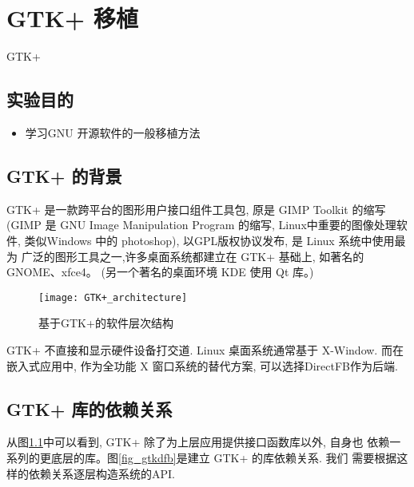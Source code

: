 \chapter{GTK+ 移植}{GTK+}

\section{实验目的}
\begin{itemize}
  \item 学习GNU 开源软件的一般移植方法
\end{itemize}

\section{GTK+ 的背景}
GTK+ 是一款跨平台的图形用户接口组件工具包, 原是 GIMP Toolkit 的缩写
(GIMP 是 GNU Image Manipulation Program 的缩写, Linux中重要的图像处理软件,
类似Windows 中的 photoshop), 以GPL版权协议发布, 是 Linux 系统中使用最为
广泛的图形工具之一,许多桌面系统都建立在 GTK+ 基础上, 如著名的 GNOME、xfce4。
(另一个著名的桌面环境 KDE 使用 Qt 库。)

\begin{figure}[h]
  \centering
  \texttt{[image: GTK+\_architecture]}
    \caption[基于GTK+的软件层次结构]
    {基于GTK+的软件层次结构\footnotemark} \label{fig_gtk}
\end{figure}

    GTK+ 不直接和显示硬件设备打交道. Linux 桌面系统通常基于 X-Window. 而在
嵌入式应用中, 作为全功能 X 窗口系统的替代方案, 可以选择DirectFB作为后端. 

\section{GTK+ 库的依赖关系}
从图\ref{fig_gtk}中可以看到, GTK+ 除了为上层应用提供接口函数库以外, 自身也
依赖一系列的更底层的库。图\ref{fig_gtkdfb}是建立 GTK+ 的库依赖关系. 我们
需要根据这样的依赖关系逐层构造系统的API.

